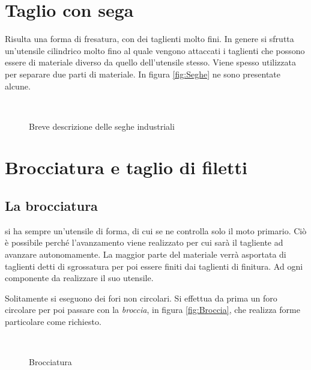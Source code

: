 \section{Taglio con sega}
Risulta una forma di fresatura, con dei taglienti molto fini.
In genere si sfrutta un'utensile cilindrico molto fino al quale vengono
attaccati i taglienti che possono essere di materiale diverso da quello 
dell'utensile stesso.
Viene spesso utilizzata per separare due parti di materiale.
In figura \ref{fig:Seghe} ne sono presentate alcune.

\begin{figure}
\centering
{}\\
\caption{Breve descrizione delle seghe industriali}
\label{fig:SegheInd}
\end{figure}

\section{Brocciatura e taglio di filetti}
\subsection{La brocciatura}
si ha sempre un'utensile di forma, di cui se ne controlla solo il moto primario. Ciò è possibile perché l'avanzamento viene realizzato per cui
sarà il tagliente ad avanzare autonomamente.
La maggior parte del materiale verrà asportata di taglienti detti di sgrossatura per poi essere finiti dai taglienti di finitura.
Ad ogni componente da realizzare il suo utensile.

Solitamente si eseguono dei fori non circolari. Si effettua da prima 
un foro circolare per poi passare con la \textit{broccia}, in figura \ref{fig:Broccia}, che realizza forme particolare come richiesto.

\begin{figure}
\centering
{}\\
\caption{Brocciatura}
\label{fig:Brocciatura}
\end{figure}

